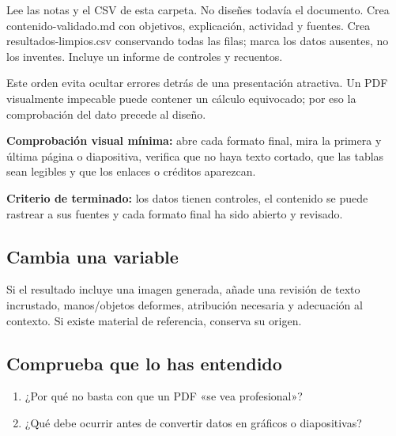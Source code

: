 \documentclass[10pt,a4paper,openany]{book}
\providecommand{\tightlist}{\setlength{\itemsep}{0.18em}\setlength{\parskip}{0pt}}
\newenvironment{Shaded}{}{}
\newcommand{\NormalTok}[1]{#1}
\renewenvironment{Shaded}
  {\begin{tcolorbox}[
    enhanced,
    breakable,
    colback=CodeBg,
    colframe=Border,
    boxrule=0.5pt,
    arc=2mm,
    left=3mm,
    right=3mm,
    top=2.2mm,
    bottom=2.2mm,
    before skip=0.8em,
    after skip=0.9em
  ]}
  {\end{tcolorbox}}
\begin{document}
\begin{Shaded}
\begin{Highlighting}[]
\NormalTok{Lee las notas y el CSV de esta carpeta. No diseñes todavía el documento.}
\NormalTok{Crea contenido{-}validado.md con objetivos, explicación, actividad y fuentes.}
\NormalTok{Crea resultados{-}limpios.csv conservando todas las filas; marca los datos}
\NormalTok{ausentes, no los inventes. Incluye un informe de controles y recuentos.}
\end{Highlighting}
\end{Shaded}

Este orden evita ocultar errores detrás de una presentación atractiva.
Un PDF visualmente impecable puede contener un cálculo equivocado; por
eso la comprobación del dato precede al diseño.

\textbf{Comprobación visual mínima:} abre cada formato final, mira la
primera y última página o diapositiva, verifica que no haya texto
cortado, que las tablas sean legibles y que los enlaces o créditos
aparezcan.

\begin{successbox}

\textbf{Criterio de terminado:} los datos tienen controles, el contenido
se puede rastrear a sus fuentes y cada formato final ha sido abierto y
revisado.

\end{successbox}

\subsection{Cambia una variable}\label{cambia-una-variable-7}

Si el resultado incluye una imagen generada, añade una revisión de texto
incrustado, manos/objetos deformes, atribución necesaria y adecuación al
contexto. Si existe material de referencia, conserva su origen.

\subsection{Comprueba que lo has
entendido}\label{comprueba-que-lo-has-entendido-7}

\begin{enumerate}
\def\labelenumi{\arabic{enumi}.}
\tightlist
\item
  ¿Por qué no basta con que un PDF «se vea profesional»?
\item
  ¿Qué debe ocurrir antes de convertir datos en gráficos o diapositivas?
\end{enumerate}
\end{document}
